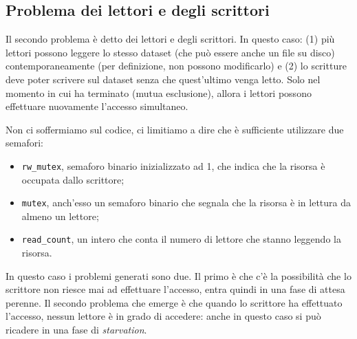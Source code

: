 % 
\subsection{Problema dei lettori e degli scrittori}
Il secondo problema è detto dei lettori e degli scrittori. In questo caso: (1) più lettori possono leggere lo stesso dataset (che può essere anche un file su disco) contemporaneamente (per definizione, non possono modificarlo) e (2) lo scritture deve poter scrivere sul dataset senza che quest'ultimo venga letto. Solo nel momento in cui ha terminato (mutua esclusione), allora i lettori possono effettuare nuovamente l'accesso simultaneo. 

Non ci soffermiamo sul codice, ci limitiamo a dire che è sufficiente utilizzare due semafori:
\vspace{-5px}
\begin{itemize}
\setlength{\itemsep}{-.25 em}
    \item \texttt{rw\_mutex}, semaforo binario inizializzato ad 1, che indica che la risorsa è occupata dallo scrittore;
    \item \texttt{mutex}, anch'esso un semaforo binario che segnala che la risorsa è in lettura da almeno un lettore;
    \item \texttt{read\_count}, un intero che conta il numero di lettore che stanno leggendo la risorsa.
\end{itemize}

In questo caso i problemi generati sono due. Il primo è che c'è la possibilità che lo scrittore non riesce mai ad effettuare l'accesso, entra quindi in una fase di attesa perenne. Il secondo problema che emerge è che quando lo scrittore ha effettuato l'accesso, nessun lettore è in grado di accedere: anche in questo caso si può ricadere in una fase di \textit{starvation}.

% 
